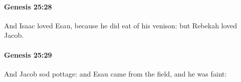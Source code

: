 		\paragraph{Genesis 25:28} %
			\label{GENESIS-25-28}

			And Isaac loved Esau, because he did eat of his venison: but Rebekah loved Jacob.


		\paragraph{Genesis 25:29} %
			\label{GENESIS-25-29}

			And Jacob sod pottage: and Esau came from the field, and he was faint:



